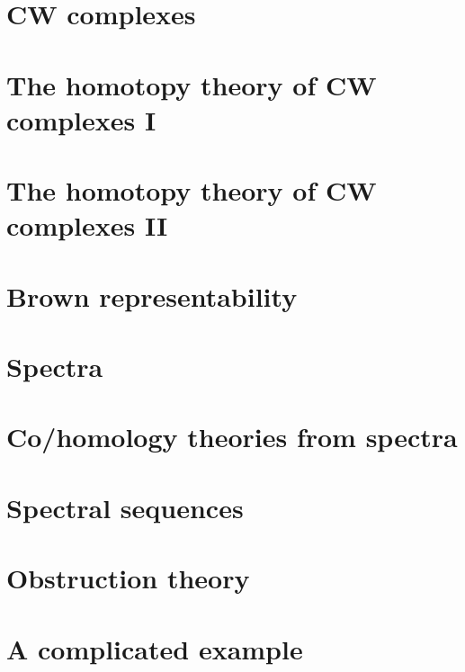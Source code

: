 \documentclass{amsart}
\theoremstyle{plain}
\theoremstyle{definition}
\theoremstyle{remark}
\begin{document}
\section{CW complexes}




\section{The homotopy theory of CW complexes I}




\section{The homotopy theory of CW complexes II}




\section{Brown representability}




\section{Spectra}




\section{Co/homology theories from spectra}




\section{Spectral sequences}




\section{Obstruction theory}




\section{A complicated example}
\end{document}
